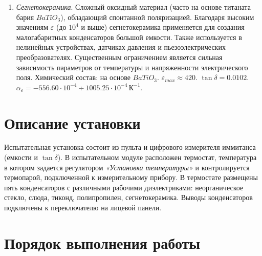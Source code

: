 \begin{enumerate}
    \item \textit{Сегнетокерамика}.
    Сложный оксидный материал (часто на основе титаната бария $BaTiO_3$), обладающий спонтанной поляризацией.
    Благодаря высоким значениям $\varepsilon$ (до $10^4$ и выше) сегнетокерамика применяется для создания малогабаритных конденсаторов большой емкости.
    Также используется в нелинейных устройствах, датчиках давления и пьезоэлектрических преобразователях.
    Существенным ограничением является сильная зависимость параметров от температуры и напряженности электрического поля.
    Химический состав: на основе $BaTiO_3$.
    $\varepsilon_{max} \approx 420$.
    $\tan\delta = 0.0102$.
    $\alpha_\varepsilon = -556.60 \cdot 10^{-4} \div 1005.25 \cdot 10^{-4}\,\text{К}^{-1}$.
\end{enumerate}

\section*{Описание установки}
Испытательная установка состоит из пульта и цифрового измерителя иммитанса (емкости и $\tan \delta$). В испытательном модуле расположен термостат, температура в котором задается регулятором \textit{«Установка температуры»} и контролируется термопарой, подключенной к измерительному прибору. В термостате размещены пять конденсаторов с различными рабочими диэлектриками: неорганическое стекло, слюда, тиконд, полипропилен, сегнетокерамика. Выводы конденсаторов подключены к переключателю на лицевой панели.

\section*{Порядок выполнения работы}

